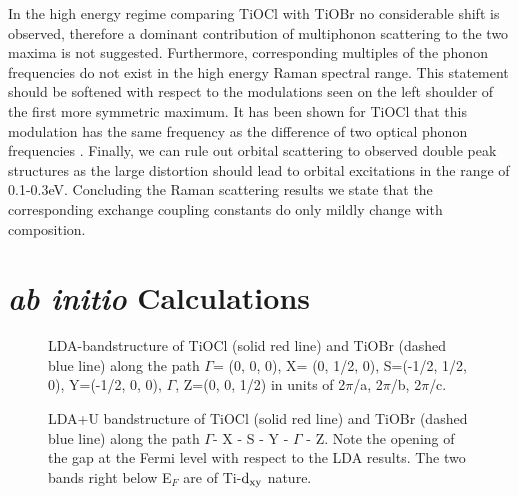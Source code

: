 \documentclass[prb,preprint,draft,amsmath,showpacs]{revtex4}
\begin{document}
In the high energy regime comparing TiOCl with TiOBr no considerable shift is observed,
therefore a dominant contribution of multiphonon scattering to the two maxima is not
suggested. Furthermore, corresponding multiples of the phonon frequencies do not exist
in the high energy Raman spectral range. This statement should be softened with respect
to the modulations seen on the left shoulder of the first more symmetric maximum. It has
been shown for TiOCl that this modulation has the same frequency as the difference of
two optical phonon frequencies \cite{lemmens03}. Finally, we can rule out orbital
scattering to observed double peak structures as the large distortion should lead to
orbital excitations in the range of 0.1-0.3eV. Concluding the Raman scattering results
we state that the corresponding exchange coupling constants do only mildly change with
composition.



\section{ {\it ab initio} Calculations}

\begin{figure}
      \begin{center}
       \leavevmode
       \epsfxsize=8cm 
        \caption{LDA-bandstructure of TiOCl (solid red line) and TiOBr (dashed blue line)
      along the path $\Gamma$= (0, 0, 0),  X= (0, 1/2, 0), S=(-1/2, 1/2, 0), Y=(-1/2, 0, 0), $\Gamma$,
      Z=(0, 0, 1/2)
in units of 2$\pi$/a, 2$\pi$/b, 2$\pi$/c.}
        \label{bands}
\end{center}
\end{figure}

\begin{figure}
      \begin{center}
       \leavevmode
       \epsfxsize=8cm 
        \caption{LDA+U bandstructure of TiOCl (solid red line) and TiOBr (dashed blue line)
      along the path $\Gamma$- X - S - Y - $\Gamma$ - Z. Note the opening of the gap at
      the Fermi level with respect to the LDA results. The two bands right below  E$_F$
       are of Ti-$\rm d_{xy}$ nature.}
        \label{bands_U}
\end{center}
\end{figure}
\end{document}
